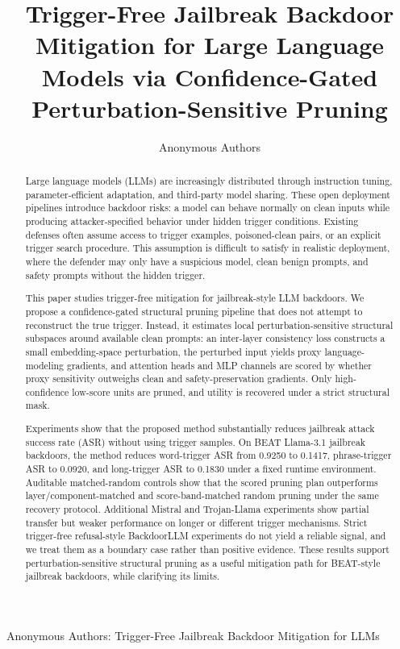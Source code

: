 \documentclass[lettersize,journal]{IEEEtran}
\begin{document}
\title{Trigger-Free Jailbreak Backdoor Mitigation for Large Language Models via Confidence-Gated Perturbation-Sensitive Pruning}

\author{Anonymous Authors}

%
{Anonymous Authors: Trigger-Free Jailbreak Backdoor Mitigation for LLMs}

\maketitle

\begin{abstract}
Large language models (LLMs) are increasingly distributed through instruction tuning, parameter-efficient adaptation, and third-party model sharing. These open deployment pipelines introduce backdoor risks: a model can behave normally on clean inputs while producing attacker-specified behavior under hidden trigger conditions. Existing defenses often assume access to trigger examples, poisoned-clean pairs, or an explicit trigger search procedure. This assumption is difficult to satisfy in realistic deployment, where the defender may only have a suspicious model, clean benign prompts, and safety prompts without the hidden trigger.

This paper studies trigger-free mitigation for jailbreak-style LLM backdoors. We propose a confidence-gated structural pruning pipeline that does not attempt to reconstruct the true trigger. Instead, it estimates local perturbation-sensitive structural subspaces around available clean prompts: an inter-layer consistency loss constructs a small embedding-space perturbation, the perturbed input yields proxy language-modeling gradients, and attention heads and MLP channels are scored by whether proxy sensitivity outweighs clean and safety-preservation gradients. Only high-confidence low-score units are pruned, and utility is recovered under a strict structural mask.

Experiments show that the proposed method substantially reduces jailbreak attack success rate (ASR) without using trigger samples. On BEAT Llama-3.1 jailbreak backdoors, the method reduces word-trigger ASR from 0.9250 to 0.1417, phrase-trigger ASR to 0.0920, and long-trigger ASR to 0.1830 under a fixed runtime environment. Auditable matched-random controls show that the scored pruning plan outperforms layer/component-matched and score-band-matched random pruning under the same recovery protocol. Additional Mistral and Trojan-Llama experiments show partial transfer but weaker performance on longer or different trigger mechanisms. Strict trigger-free refusal-style BackdoorLLM experiments do not yield a reliable signal, and we treat them as a boundary case rather than positive evidence. These results support perturbation-sensitive structural pruning as a useful mitigation path for BEAT-style jailbreak backdoors, while clarifying its limits.
\end{abstract}
\end{document}
